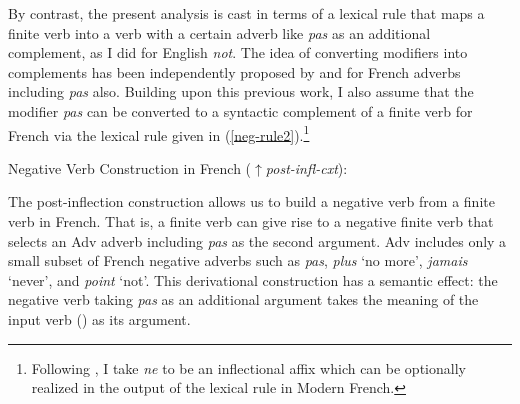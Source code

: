\documentclass[output=paper]{langsci/langscibook}
\begin{document}
{\begin{exe}
\begin{xlist}
\begin{exe}
\begin{xlist}
By contrast, the present analysis is cast
in terms of a lexical rule that maps a finite verb into a verb
with a certain adverb like \emph{pas} as an additional complement, as
I did for English \emph{not}.  The idea of converting modifiers into
complements has been independently proposed by \citet{Miller92d-u} and
\citet{AG:94} for French adverbs including
\emph{pas} also.  Building upon this
previous work, I also assume that the modifier \emph{pas} can
be converted to a syntactic complement of a
finite verb for French via the lexical rule given
in (\ref{neg-rule2}).\footnote{Following \citet{Miller92d-u}, I take \emph{ne} to
be an inflectional affix which can be optionally realized
in the output of the lexical rule in Modern French.}

\ea
\label{neg-rule2} Negative Verb Construction in French ($\uparrow${\it post-infl-cxt}):\\
\z




%
%
\noindent The post-inflection construction allows us
to build a negative verb from a finite verb in French.
That is, a finite verb can give rise to a negative finite
verb that selects an Adv
adverb including \emph{pas} as the second
argument.
Adv includes only a small subset of French negative adverbs such
as \emph{pas}, \emph{plus} `no more', \emph{jamais} `never', and
\emph{point} `not'. This derivational construction has a semantic effect: the
negative verb taking \emph{pas} as an additional argument takes the meaning of
the input verb () as its argument.


\end{xlist}
\end{exe}
\end{xlist}
\end{exe}}
\end{document}
